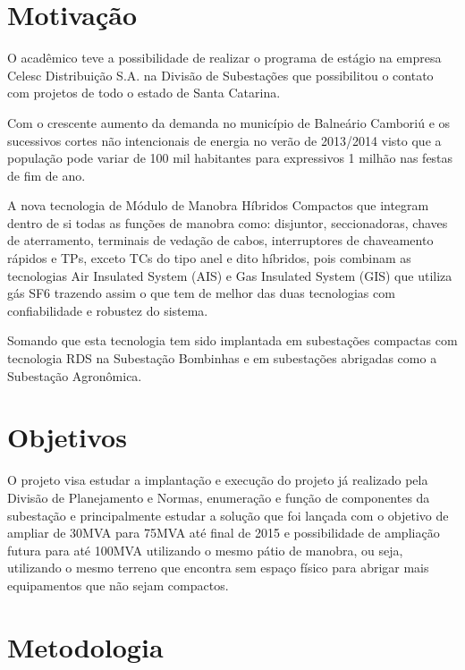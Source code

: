 \documentclass[a5paper,english,spanish,brazil]{ufsc-thesis}
\begin{document}
	\section{Motivação}
		O acadêmico teve a possibilidade de realizar o programa de estágio na empresa Celesc Distribuição S.A. na Divisão de Subestações que possibilitou o contato com projetos de todo o estado de Santa Catarina. \par
		Com o crescente aumento da demanda no município de Balneário Camboriú e os sucessivos cortes não intencionais de energia no verão de 2013/2014 visto que a população pode variar de 100 mil habitantes para expressivos 1 milhão nas festas de fim de ano.\par
		A nova tecnologia de Módulo de Manobra Híbridos Compactos que integram dentro de si todas as funções de manobra como: disjuntor, seccionadoras, chaves de aterramento, terminais de vedação de cabos, interruptores de chaveamento rápidos e TPs, exceto TCs do tipo anel e dito híbridos, pois combinam as tecnologias Air Insulated System (AIS) e Gas Insulated System (GIS) que utiliza gás SF6 trazendo assim o que tem de melhor das duas tecnologias com confiabilidade e robustez do sistema.\par
		Somando que esta tecnologia tem sido implantada em subestações compactas com tecnologia RDS na Subestação Bombinhas e em subestações abrigadas como a Subestação Agronômica.

	\section{Objetivos}
		O projeto visa estudar a implantação e execução do projeto já realizado pela Divisão de Planejamento e Normas, enumeração e função de componentes da subestação e principalmente estudar a solução que foi lançada com o objetivo de ampliar de 30MVA para 75MVA até final de 2015 e possibilidade de ampliação futura para até 100MVA utilizando o mesmo pátio de manobra, ou seja, utilizando o mesmo terreno que encontra sem espaço físico para abrigar mais equipamentos que não sejam compactos.

	\section{Metodologia}
	\lipsum[1]


\end{document}
